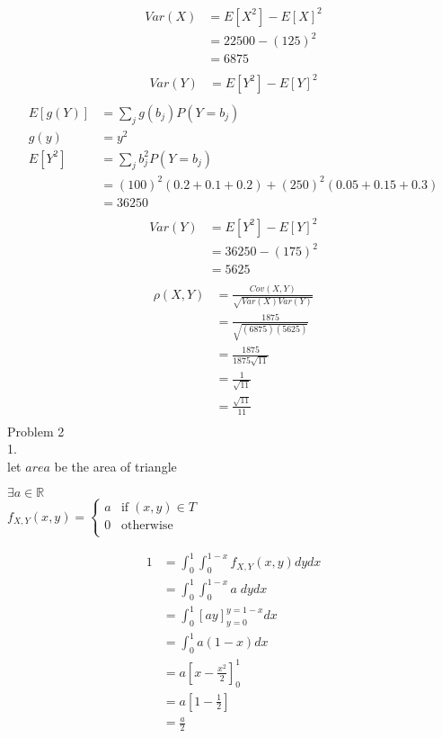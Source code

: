 \documentclass[12pt,border=4pt,multi]{article} %
\begin{document}
\begin{align*}
Var(X) &= E[X^2] - E[X]^2\\
&= 22500 - (125)^2\\
&= 6875\\
\end{align*}
\begin{align*}
Var(Y) &= E[Y^2] - E[Y]^2\\
\end{align*}
\begin{align*}
E[g(Y)] &= \sum_j g(b_j) P(Y = b_j)\\
g(y) &= y^2\\
E[Y^2] &= \sum_j b_j^2 P(Y = b_j)\\
&= (100)^2(0.2 + 0.1 + 0.2) + (250)^2(0.05 + 0.15 + 0.3)\\
&= 36250\\
\end{align*} 
\begin{align*}
Var(Y) &= E[Y^2] - E[Y]^2\\
&= 36250 - (175)^2\\
&= 5625\\
\end{align*}
\begin{align*}
\rho(X, Y) &= \frac{Cov(X, Y)}{\sqrt{Var(X) Var(Y)}}\\
&= \frac{1875}{\sqrt{(6875)(5625)}}\\
&= \frac{1875}{1875\sqrt{11}}\\
&= \frac{1}{\sqrt{11}}\\
&= \boxed{\frac{\sqrt{11}}{11}}\\
\end{align*}
\newpage
\noindent
Problem 2\\
1.\\
let $area$ be the area of triangle\\
\begin{center}
$\exists a \in \mathbb{R}$\\
$f_{X, Y}(x, y) = 
\begin{cases}
a & \text{if}\;(x, y) \in T\\
0 & \text{otherwise}\\
\end{cases}$
\end{center}
\begin{align*}
1 &= \int_0^1 \int_0^{1 - x} f_{X, Y}(x, y) dy dx\\
&= \int_0^1 \int_0^{1 - x} a\; dy dx\\
&= \int_0^1 [ay]_{y = 0}^{y = 1 - x} dx\\
&= \int_0^1 a(1 - x)dx\\
&= a\left[x - \frac{x^2}{2}\right]_0^1\\
&= a\left[1 - \frac{1}{2}\right]\\
&= \frac{a}{2}\\
\end{align*}
\end{document}
